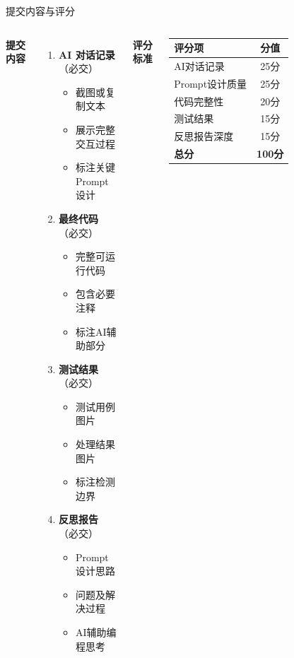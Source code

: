 \begin{frame}{提交内容与评分}
	\begin{columns}
		\textbf{提交内容}

		\vspace{0.2cm}

		\begin{enumerate}
			\item \textbf{AI 对话记录}（必交）
			      \begin{itemize}
				      \item 截图或复制文本
				      \item 展示完整交互过程
				      \item 标注关键Prompt设计
			      \end{itemize}

			\item \textbf{最终代码}（必交）
			      \begin{itemize}
				      \item 完整可运行代码
				      \item 包含必要注释
				      \item 标注AI辅助部分
			      \end{itemize}

			\item \textbf{测试结果}（必交）
			      \begin{itemize}
				      \item 测试用例图片
				      \item 处理结果图片
				      \item 标注检测边界
			      \end{itemize}

			\item \textbf{反思报告}（必交）
			      \begin{itemize}
				      \item Prompt设计思路
				      \item 问题及解决过程
				      \item AI辅助编程思考
			      \end{itemize}
		\end{enumerate}

		\textbf{评分标准}

		\vspace{0.2cm}

		\begin{table}
			\centering
			\small
			\begin{tabular}{lc}
				\toprule
				\textbf{评分项} & \textbf{分值} \\
				\midrule
				AI对话记录 & 25分 \\
				Prompt设计质量 & 25分 \\
				代码完整性 & 20分 \\
				测试结果 & 15分 \\
				反思报告深度 & 15分 \\
				\midrule
				\textbf{总分} & \textbf{100分} \\
				\bottomrule
			\end{tabular}
		\end{table}


\end{columns}
\end{frame}
